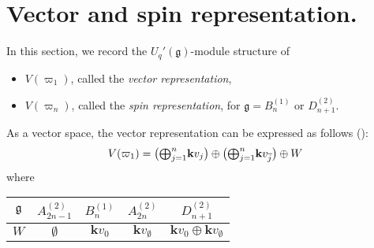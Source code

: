 \documentclass[11pt, leqno]{amsart}
\theoremstyle{definition}
\numberwithin{equation}{section}
\begin{document}
\section{Vector and spin representation.} \label{Append: vector spin reps}
In this section, we record the ${U_q'({\mathfrak g})}$-module structure of
\begin{itemize}
\item $V({\varpi}_1)$, called the {\it vector representation},
\item $V(\varpi_n)$, called the {\it spin representation}, for ${\mathfrak g}=B^{(1)}_{n}$ or $D^{(2)}_{n+1}$.
\end{itemize}
As a vector space, the vector representation can be expressed as follows (\cite[Chapter 11]{HK02}):
$$V({\varpi}_1)=\big( {\mathop{\mbox{\normalsize$\bigoplus$}}\limits}_{j=1}^n {\mathbf{k}} v_j  \big) \oplus \big( {\mathop{\mbox{\normalsize$\bigoplus$}}\limits}_{j=1}^n {\mathbf{k}} v_{\overline{j}} \big) \oplus W$$
where
\begin{center}
\begin{tabular}{ | c | c | c | c | c  | } \hline
${\mathfrak g}$ & $A^{(2)}_{2n-1}$ &  $B^{(1)}_{n}$ &  $A^{(2)}_{2n}$ &  $D^{(2)}_{n+1}$ \\ \hline
$W$ & $\emptyset$ & ${\mathbf{k}} v_0$  & ${\mathbf{k}} v_\emptyset$ & ${\mathbf{k}} v_0 \oplus {\mathbf{k}} v_\emptyset$ \\ \hline
\end{tabular}
\end{center}
\end{document}
